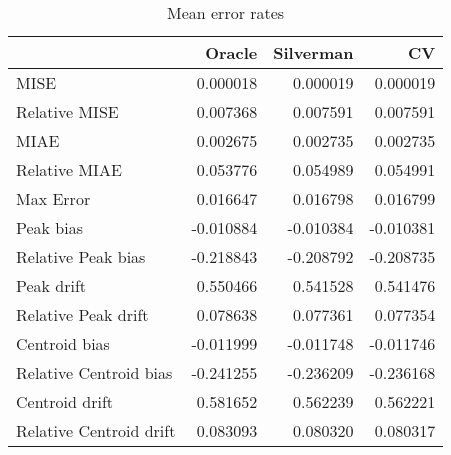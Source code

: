 \begin{table}[H]
\centering
\begin{tabular}{lrrr}
  \hline
 & Oracle & Silverman & CV \\ 
  \hline
MISE & 0.000018 & 0.000019 & 0.000019 \\ 
  Relative MISE & 0.007368 & 0.007591 & 0.007591 \\ 
  MIAE & 0.002675 & 0.002735 & 0.002735 \\ 
  Relative MIAE & 0.053776 & 0.054989 & 0.054991 \\ 
  Max Error & 0.016647 & 0.016798 & 0.016799 \\ 
  Peak bias & -0.010884 & -0.010384 & -0.010381 \\ 
  Relative Peak bias & -0.218843 & -0.208792 & -0.208735 \\ 
  Peak drift & 0.550466 & 0.541528 & 0.541476 \\ 
  Relative Peak drift & 0.078638 & 0.077361 & 0.077354 \\ 
  Centroid bias & -0.011999 & -0.011748 & -0.011746 \\ 
  Relative Centroid bias & -0.241255 & -0.236209 & -0.236168 \\ 
  Centroid drift & 0.581652 & 0.562239 & 0.562221 \\ 
  Relative Centroid drift & 0.083093 & 0.080320 & 0.080317 \\ 
   \hline
\end{tabular}
\caption{Mean error rates} 
\label{tbl:mean_error_rates}
\end{table}
